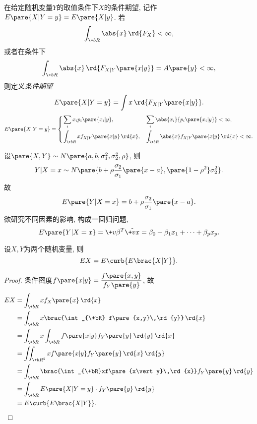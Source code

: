 \documentclass[../Statistics.tex]{subfiles}
\begin{document}
在给定随机变量$Y$的取值条件下$X$的条件期望, 记作$E\pare{X\vert Y=y} = E\pare{X\vert y}$. 若
\[ \int_{\+bR} \abs{x} \,\rd{F_X} < \infty, \]
或者在条件下
\[ \int_{\+bR} \abs{x}\,\rd{F_{X\vert Y}\pare{x\vert y}} = A\pare{y} < \infty, \]
则定义\emph{条件期望}
\[ E\pare{X\vert Y=y} = \int x\,\rd{F_{X\vert Y}\pare{x\vert y}}. \]
\[ E\pare{X\vert Y=y} = \left\{\begin{aligned}
    &\sum_i x_i {p_i\pare{x_i\vert y}}, && \sum_i \abs{x_i} {p_i\pare{x_i\vert y}}<\infty, \\
    &\int_{\+bR} x f_{X\vert Y}\pare{x\vert y}\,\rd{x}, && \int_{\+bR} \abs{x} f_{X\vert Y}\pare{x\vert y}\,\rd{x} < \infty.
\end{aligned}\right. \]
\begin{sample}
    \begin{ex}
        设$\pare{X,Y}\sim N\pare{a,b,\sigma_1^2,\sigma_2^2, \rho}$, 则
        \[ Y\vert X=x \sim N\pare{b+\rho \frac{\sigma_2}{\sigma_1}\pare{x-a}, \pare{1-\rho^2}\sigma_2^2}. \]
        故
        \[ E\pare{Y\vert X=x} = b + \rho \frac{\sigma_2}{\sigma_1} \pare{x-a}. \]
        欲研究不同因素的影响, 构成一回归问题,
        \[ E\pare{Y\vert X=x} = \+v\beta^T \tilde{\+vx} = \beta_0 + \beta_1 x_1 + \cdots + \beta_p x_p. \]
    \end{ex}
\end{sample}
\begin{theorem}[全期望公式]
    设$X,Y$为两个随机变量, 则
    \[ EX = E\curb{E\brac{X\vert Y}}. \]
\end{theorem}
\begin{proof}
    条件密度$\displaystyle f\pare{x\vert y} = \frac{f\pare{x,y}}{f_Y\pare{y}}$, 故
    \begin{align*}
        EX &= \int_{\+bR} xf_X\pare{x}\,\rd{x} \\
        &= \int_{\+bR} x\brac{\int_{\+bR} f\pare{x,y}\,\rd{y}}\,\rd{x} \\
        &= \int_{\+bR} x\int_{\+bR} f\pare{x\vert y}f_Y\pare{y}\,\rd{y}\,\rd{x} \\
        &= \iint_{\+bR^2} xf\pare{x\vert y} f_Y\pare{y} \,\rd{x}\,\rd{y} \\
        &= \int_{\+bR} \brac{\int_{\+bR}xf\pare{x\vert y}\,\rd{x}}f_Y\pare{y}\,\rd{y} \\
        &= \int_{\+bR} E\pare{X\vert Y=y} \cdot f_Y\pare{y}\,\rd{y} \\
        &= E\curb{E\brac{X\vert Y}}. \qedhere
    \end{align*}
\end{proof}
\end{document}
